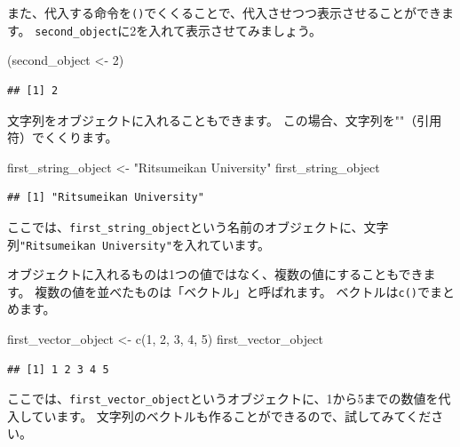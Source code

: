 \documentclass[
]{book}
\newenvironment{Shaded}{\begin{snugshade}}{\end{snugshade}}
\newcommand{\DecValTok}[1]{\textcolor[rgb]{0.00,0.00,0.81}{#1}}
\newcommand{\FunctionTok}[1]{\textcolor[rgb]{0.00,0.00,0.00}{#1}}
\newcommand{\NormalTok}[1]{#1}
\newcommand{\OtherTok}[1]{\textcolor[rgb]{0.56,0.35,0.01}{#1}}
\newcommand{\StringTok}[1]{\textcolor[rgb]{0.31,0.60,0.02}{#1}}
\begin{document}
また、代入する命令を\texttt{()}でくくることで、代入させつつ表示させることができます。
\texttt{second\_object}に2を入れて表示させてみましょう。

\begin{Shaded}
\begin{Highlighting}[]
\NormalTok{(second\_object }\OtherTok{\textless{}{-}} \DecValTok{2}\NormalTok{)}
\end{Highlighting}
\end{Shaded}

\begin{verbatim}
## [1] 2
\end{verbatim}

文字列をオブジェクトに入れることもできます。
この場合、文字列を""（引用符）でくくります。

\begin{Shaded}
\begin{Highlighting}[]
\NormalTok{first\_string\_object }\OtherTok{\textless{}{-}} \StringTok{"Ritsumeikan University"}
\NormalTok{first\_string\_object}
\end{Highlighting}
\end{Shaded}

\begin{verbatim}
## [1] "Ritsumeikan University"
\end{verbatim}

ここでは、\texttt{first\_string\_object}という名前のオブジェクトに、文字列\texttt{"Ritsumeikan\ University"}を入れています。

オブジェクトに入れるものは1つの値ではなく、複数の値にすることもできます。
複数の値を並べたものは「ベクトル」と呼ばれます。
ベクトルは\texttt{c()}でまとめます。

\begin{Shaded}
\begin{Highlighting}[]
\NormalTok{first\_vector\_object }\OtherTok{\textless{}{-}} \FunctionTok{c}\NormalTok{(}\DecValTok{1}\NormalTok{, }\DecValTok{2}\NormalTok{, }\DecValTok{3}\NormalTok{, }\DecValTok{4}\NormalTok{, }\DecValTok{5}\NormalTok{)}
\NormalTok{first\_vector\_object}
\end{Highlighting}
\end{Shaded}

\begin{verbatim}
## [1] 1 2 3 4 5
\end{verbatim}

ここでは、\texttt{first\_vector\_object}というオブジェクトに、1から5までの数値を代入しています。
文字列のベクトルも作ることができるので、試してみてください。
\end{document}
